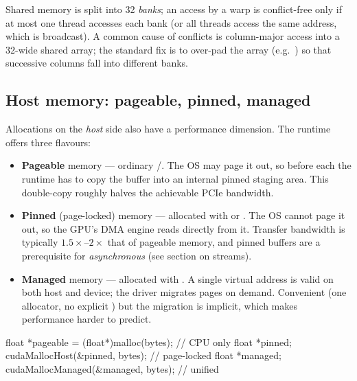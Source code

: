 \begin{warningblock}
Shared memory is split into 32 \textit{banks}; an access by a warp is conflict-free only if at most one thread accesses each bank (or all threads access the same address, which is broadcast). A common cause of conflicts is column-major access into a 32-wide shared array; the standard fix is to over-pad the array (e.g.\ ) so that successive columns fall into different banks.
\end{warningblock}

\subsection{Host memory: pageable, pinned, managed}

Allocations on the \emph{host} side also have a performance dimension. The runtime offers three flavours:

\begin{itemize}
    \item \textbf{Pageable} memory --- ordinary /. The OS may page it out, so before each  the runtime has to copy the buffer into an internal pinned staging area. This double-copy roughly halves the achievable PCIe bandwidth.
    \item \textbf{Pinned} (page-locked) memory --- allocated with  or . The OS cannot page it out, so the GPU's DMA engine reads directly from it. Transfer bandwidth is typically $1.5\times$--$2\times$ that of pageable memory, and pinned buffers are a prerequisite for \emph{asynchronous}  (see section on streams).
    \item \textbf{Managed} memory --- allocated with . A single virtual address is valid on both host and device; the driver migrates pages on demand. Convenient (one allocator, no explicit ) but the migration is implicit, which makes performance harder to predict.
\end{itemize}

\begin{codeblock}[language=C]
float *pageable = (float*)malloc(bytes);              // CPU only
float *pinned;   cudaMallocHost(&pinned, bytes);      // page-locked
float *managed;  cudaMallocManaged(&managed, bytes);  // unified
\end{codeblock}

